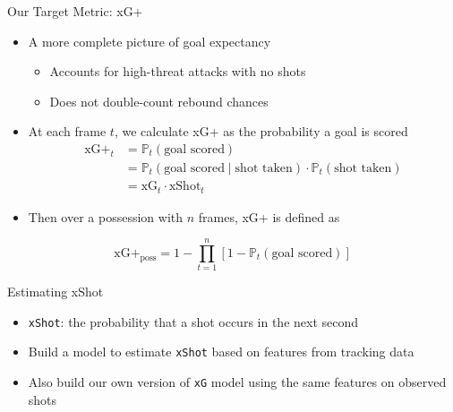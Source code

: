 \documentclass[
  11pt,
  ignorenonframetext,
]{beamer}
\providecommand{\tightlist}{%
  \setlength{\itemsep}{0pt}\setlength{\parskip}{0pt}}
\begin{document}
\begin{frame}{Our Target Metric: xG+}
\protect{}\label{our-target-metric-xg}
\begin{itemize}
\tightlist
\item
  A more complete picture of goal expectancy

  \begin{itemize}
  \tightlist
  \item
    Accounts for high-threat attacks with no shots
  \item
    Does not double-count rebound chances
  \end{itemize}
\item
  At each frame \(t\), we calculate xG+ as the probability a goal is
  scored \begin{align*}
  \text{xG+}_t &= \mathbb{P}_t(\text{goal scored}) \\
  &= \mathbb{P}_t(\text{goal scored} \mid \text{shot taken})\cdot\mathbb{P}_t(\text{shot taken}) \\
  &= \text{xG}_t\cdot\text{xShot}_t
  \end{align*}
\item
  Then over a possession with \(n\) frames, xG+ is defined as
\end{itemize}

\[\text{xG+}_\text{poss} = 1 - \prod_{t = 1}^n \left[1 - \mathbb{P}_t\left(\text{goal scored}\right)\right]\]
\end{frame}

\begin{frame}[fragile]{Estimating xShot}
\protect{}\label{estimating-xshot}
\begin{itemize}
\tightlist
\item
  \texttt{xShot}: the probability that a shot occurs in the next second
\item
  Build a model to estimate \texttt{xShot} based on features from
  tracking data
\item
  Also build our own version of \texttt{xG} model using the same
  features on observed shots
\end{itemize}
\end{frame}
\end{document}
